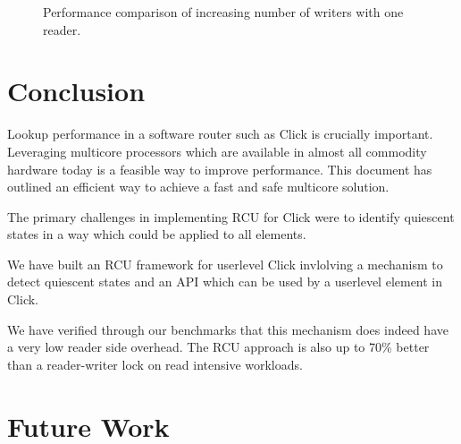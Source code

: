 \documentclass[a4paper,marginparwidth=50pt,marginparsep=10pt]{article}
\begin{document}
\begin{figure}[tph]
\begin{center}
\caption{Performance comparison of increasing number of writers with one reader.}
\label{img:micro_1r_vw}
\end{center}
\end{figure}


\section{Conclusion}
Lookup performance in a software router such as Click is crucially
important. Leveraging multicore processors which are available in almost all commodity hardware
today is a feasible way to improve performance. This document has outlined an efficient way to achieve a fast and safe multicore solution.


The primary challenges in implementing RCU for Click were to
identify quiescent states in a way which could be applied to all
elements. 

We have built an RCU framework for userlevel Click invlolving a
mechanism to detect quiescent states and an API which can be used by
a userlevel element in Click.

We have verified through our benchmarks that
this mechanism does indeed have a very low reader side overhead. The RCU approach is also up to 70\% better than a reader-writer lock on read intensive workloads.

\section{Future Work}
\end{document}
